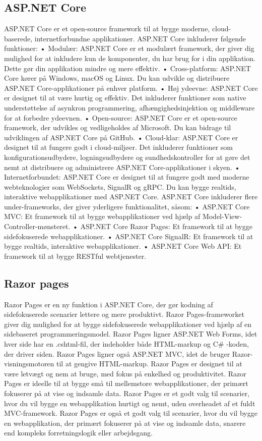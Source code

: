 \subsection{ASP.NET Core}
ASP.NET Core er et open-source framework til at bygge moderne, cloud-baserede, internetforbundne applikationer.
ASP.NET Core inkluderer følgende funktioner:
•	Modulær: ASP.NET Core er et modulært framework, der giver dig mulighed for at inkludere kun de komponenter, du har brug for i din applikation. Dette gør din applikation mindre og mere effektiv.
•	Cross-platform: ASP.NET Core kører på Windows, macOS og Linux. Du kan udvikle og distribuere ASP.NET Core-applikationer på enhver platform.
•	Høj ydeevne: ASP.NET Core er designet til at være hurtig og effektiv. Det inkluderer funktioner som native understøttelse af asynkron programmering, afhængighedsinjektion og middleware for at forbedre ydeevnen.
•	Open-source: ASP.NET Core er et open-source framework, der udvikles og vedligeholdes af Microsoft. Du kan bidrage til udviklingen af ASP.NET Core på GitHub.
•	Cloud-klar: ASP.NET Core er designet til at fungere godt i cloud-miljøer. Det inkluderer funktioner som konfigurationsudbydere, logningsudbydere og sundhedskontroller for at gøre det nemt at distribuere og administrere ASP.NET Core-applikationer i skyen.
•	Internetforbundet: ASP.NET Core er designet til at fungere godt med moderne webteknologier som WebSockets, SignalR og gRPC. Du kan bygge realtids, interaktive webapplikationer med ASP.NET Core.
ASP.NET Core inkluderer flere under-frameworks, der giver yderligere funktionalitet, såsom:
•	ASP.NET Core MVC: Et framework til at bygge webapplikationer ved hjælp af Model-View-Controller-mønsteret.
•	ASP.NET Core Razor Pages: Et framework til at bygge sidefokuserede webapplikationer.
•	ASP.NET Core SignalR: Et framework til at bygge realtids, interaktive webapplikationer.
•	ASP.NET Core Web API: Et framework til at bygge RESTful webtjenester.

\subsection{Razor pages}
Razor Pages er en ny funktion i ASP.NET Core, der gør kodning af sidefokuserede scenarier lettere og mere produktivt.
Razor Pages-frameworket giver dig mulighed for at bygge sidefokuserede webapplikationer ved hjælp af en sidebaseret programmeringsmodel.
Razor Pages ligner ASP.NET Web Forms, idet hver side har en .cshtml-fil, der indeholder både HTML-markup og C\# -koden, der driver siden.
Razor Pages ligner også ASP.NET MVC, idet de bruger Razor-visningsmotoren til at gengive HTML-markup.
Razor Pages er designet til at være letvægt og nem at bruge, med fokus på enkelhed og produktivitet.
Razor Pages er ideelle til at bygge små til mellemstore webapplikationer, der primært fokuserer på at vise og indsamle data.
Razor Pages er et godt valg til scenarier, hvor du vil bygge en webapplikation hurtigt og nemt, uden overheadet af et fuldt MVC-framework.
Razor Pages er også et godt valg til scenarier, hvor du vil bygge en webapplikation, der primært fokuserer på at vise og indsamle data, snarere end kompleks forretningslogik eller arbejdsgang.

